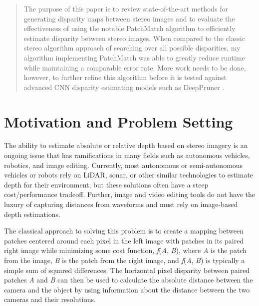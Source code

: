 \documentclass{article}
\begin{document}

\begin{abstract}
The purpose of this paper is to review state-of-the-art methods for generating disparity maps between stereo images and to evaluate the effectiveness of using the notable PatchMatch algorithm \citep{barnes2009patchmatch} to efficiently estimate disparity between stereo images. When compared to the classic stereo algorithm approach of searching over all possible disparities, my algorithm implementing PatchMatch was able to greatly reduce runtime while maintaining a comparable error rate. More work needs to be done, however, to further refine this algorithm before it is tested against advanced CNN disparity estimating models such as DeepPruner \citep{duggal2019deeppruner}.
\end{abstract}

\section{Motivation and Problem Setting}
\label{motivation}
The ability to estimate absolute or relative depth based on stereo imagery is an ongoing issue that has ramifications in many fields such as autonomous vehicles, robotics, and image editing. Currently, most autonomous or semi-autonomous vehicles or robots rely on LiDAR, sonar, or other similar technologies to estimate depth for their environment, but these solutions often have a steep cost/performance tradeoff. Further, image and video editing tools do not have the luxury of capturing distances from waveforms and must rely on image-based depth estimations.

The classical approach to solving this problem is to create a mapping between patches centered around each pixel in the left image with patches in its paired right image while minimizing some cost function, \textit{f}(\textit{A}, \textit{B}), where \textit{A} is the patch from the image, \textit{B} is the patch from the right image, and \textit{f}(\textit{A}, \textit{B}) is typically a simple sum of squared differences. The horizontal pixel disparity between paired patches \textit{A} and \textit{B} can then be used to calculate the absolute distance between the camera and the object by using information about the distance between the two cameras and their resolutions.
\end{document}

